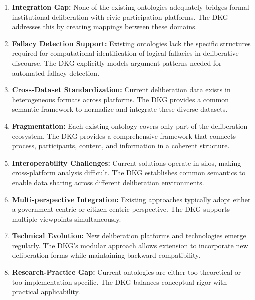 \documentclass{article}
\begin{document}
\begin{enumerate}
    \item \textbf{Integration Gap:} None of the existing ontologies adequately bridges formal institutional deliberation with civic participation platforms. The DKG addresses this by creating mappings between these domains.
    
    \item \textbf{Fallacy Detection Support:} Existing ontologies lack the specific structures required for computational identification of logical fallacies in deliberative discourse. The DKG explicitly models argument patterns needed for automated fallacy detection.
    
    \item \textbf{Cross-Dataset Standardization:} Current deliberation data exists in heterogeneous formats across platforms. The DKG provides a common semantic framework to normalize and integrate these diverse datasets.
    
    \item \textbf{Fragmentation:} Each existing ontology covers only part of the deliberation ecosystem. The DKG provides a comprehensive framework that connects process, participants, content, and information in a coherent structure.
    
    \item \textbf{Interoperability Challenges:} Current solutions operate in silos, making cross-platform analysis difficult. The DKG establishes common semantics to enable data sharing across different deliberation environments.
    
    \item \textbf{Multi-perspective Integration:} Existing approaches typically adopt either a government-centric or citizen-centric perspective. The DKG supports multiple viewpoints simultaneously.
    
    \item \textbf{Technical Evolution:} New deliberation platforms and technologies emerge regularly. The DKG's modular approach allows extension to incorporate new deliberation forms while maintaining backward compatibility.
    
    \item \textbf{Research-Practice Gap:} Current ontologies are either too theoretical or too implementation-specific. The DKG balances conceptual rigor with practical applicability.
\end{enumerate}
\end{document}
